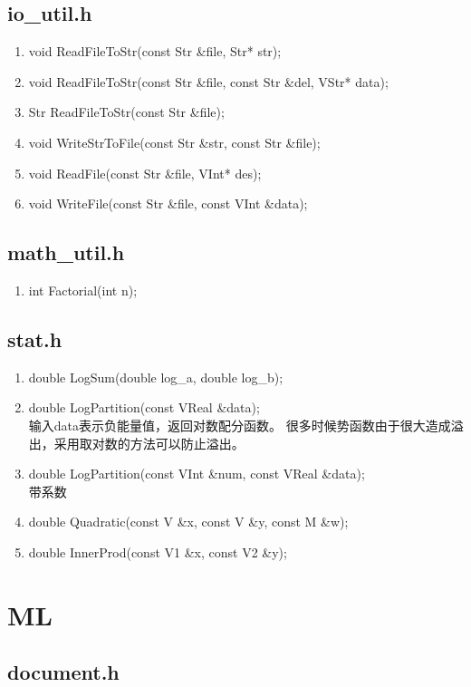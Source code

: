\section{io\_util.h}
\begin{enumerate}
\item void ReadFileToStr(const Str \&file, Str* str);
\item void ReadFileToStr(const Str \&file, const Str \&del, VStr* data);
\item Str ReadFileToStr(const Str \&file);
\item void WriteStrToFile(const Str \&str, const Str \&file);
\item void ReadFile(const Str \&file, VInt* des);
\item void WriteFile(const Str \&file, const VInt \&data);
\end{enumerate}

\section{math\_util.h}
\begin{enumerate}
\item int Factorial(int n);
\end{enumerate}

\section{stat.h}
\begin{enumerate}
\item double LogSum(double log\_a, double log\_b);
\item double LogPartition(const VReal \&data);
\\输入data表示负能量值，返回对数配分函数。
很多时候势函数由于很大造成溢出，采用取对数的方法可以防止溢出。
\item double LogPartition(const VInt \&num, const VReal \&data);
\\带系数
\item double Quadratic(const V \&x, const V \&y, const M \&w);
\item double InnerProd(const V1 \&x, const V2 \&y);
\end{enumerate}

\chapter{ML}

\section{document.h}

